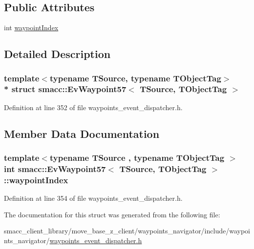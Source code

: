 \subsection*{Public Attributes}
\begin{DoxyCompactItemize}
\item 
int \hyperlink{structsmacc_1_1EvWaypoint57_a3c622130de5250b1e265c38c3b982811}{waypoint\+Index}
\end{DoxyCompactItemize}


\subsection{Detailed Description}
\subsubsection*{template$<$typename T\+Source, typename T\+Object\+Tag$>$\\*
struct smacc\+::\+Ev\+Waypoint57$<$ T\+Source, T\+Object\+Tag $>$}



Definition at line 352 of file waypoints\+\_\+event\+\_\+dispatcher.\+h.



\subsection{Member Data Documentation}
\subsubsection[{\texorpdfstring{waypoint\+Index}{waypointIndex}}]{\setlength{\rightskip}{0pt plus 5cm}template$<$typename T\+Source , typename T\+Object\+Tag $>$ int {\bf smacc\+::\+Ev\+Waypoint57}$<$ T\+Source, T\+Object\+Tag $>$\+::waypoint\+Index}\hypertarget{structsmacc_1_1EvWaypoint57_a3c622130de5250b1e265c38c3b982811}{}\label{structsmacc_1_1EvWaypoint57_a3c622130de5250b1e265c38c3b982811}


Definition at line 354 of file waypoints\+\_\+event\+\_\+dispatcher.\+h.



The documentation for this struct was generated from the following file\+:\begin{DoxyCompactItemize}
\item 
smacc\+\_\+client\+\_\+library/move\+\_\+base\+\_\+z\+\_\+client/waypoints\+\_\+navigator/include/waypoints\+\_\+navigator/\hyperlink{waypoints__event__dispatcher_8h}{waypoints\+\_\+event\+\_\+dispatcher.\+h}\end{DoxyCompactItemize}
